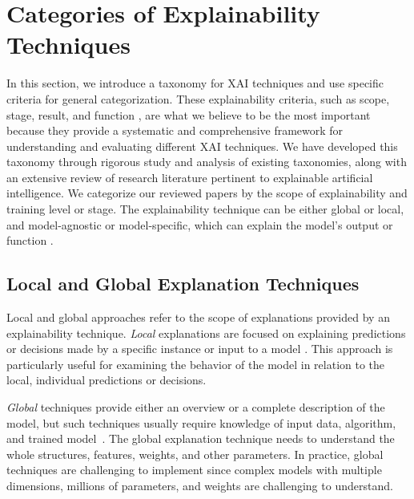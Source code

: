 \documentclass[final,5p,times,twocolumn]{elsarticle}
\begin{document}
\section{Categories of Explainability Techniques} \label{sectionTechniques}
In this section, we introduce a taxonomy for XAI techniques and use specific criteria for general categorization. These explainability criteria, such as scope, stage, result, and function \cite{das2020opportunities, arrieta2020explainable, speith2022review}, are what we believe to be the most important because they provide a systematic and comprehensive framework for understanding and evaluating different XAI techniques. We have developed this taxonomy through rigorous study and analysis of existing taxonomies, along with an extensive review of research literature pertinent to explainable artificial intelligence. We categorize our reviewed papers by the scope of explainability and training level or stage. The explainability technique can be either global or local, and model-agnostic or model-specific, which can explain the model's output or function \cite{adadi2018peeking}.
 

\subsection{Local and Global Explanation Techniques}
Local and global approaches refer to the scope of explanations provided by an explainability technique. \textit{Local} explanations are focused on explaining predictions or decisions made by a specific instance or input to a model \cite{samek2017explainable, arrieta2020explainable}. This approach is particularly useful for examining the behavior of the model in relation to the local, individual predictions or decisions. 

\textit{Global} techniques provide either an overview or a complete description of the model, but such techniques usually require knowledge of input data, algorithm, and trained model~\cite{lipton2018mythos}. The global explanation technique needs to understand the whole structures, features, weights, and other parameters. In practice, global techniques are challenging to implement since complex models with multiple dimensions, millions of parameters, and weights are challenging to understand.
\end{document}
